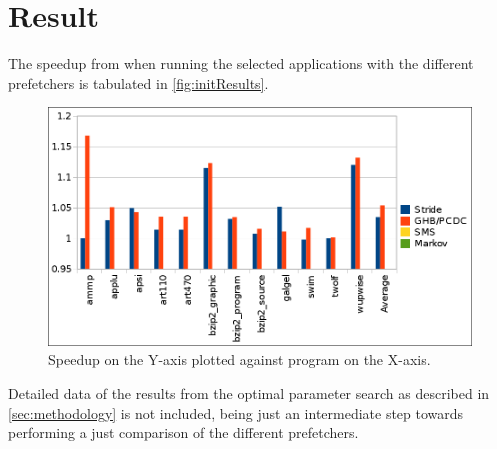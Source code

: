 
\section{Result}
\label{sec:result}

The speedup from when running the selected applications with the
different prefetchers is tabulated in \autoref{fig:initResults}.

\begin{figure}[ht]
  \centering
  \includegraphics[scale=0.25]{figures/init_results.png}
  \caption{\label{fig:initResults} Speedup on the Y-axis plotted
    against program on the X-axis.}
\end{figure}

Detailed data of the results from the optimal parameter search as
described in \autoref{sec:methodology} is not included, being just an
intermediate step towards performing a just comparison of the
different prefetchers.

%
%
%
%

